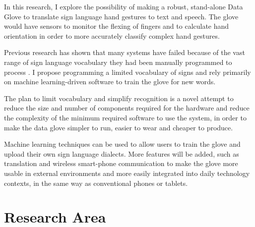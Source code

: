 

In this research, I explore the possibility of making a robust, stand-alone Data Glove to translate sign language hand gestures to text and speech. The glove would have sensors to monitor the flexing of fingers and to calculate hand orientation in order to more accurately classify complex hand gestures. 

Previous research has shown that many systems have failed because of the vast range of sign language vocabulary they had been manually programmed to process \parencite{DipietroL.SabatiniA.M.Dario2008}. I propose programming a limited vocabulary of signs and rely primarily on machine learning-driven software to train the glove for new words.

The plan to limit vocabulary and simplify recognition is a novel attempt to reduce the size and number of components required for the hardware and reduce the complexity of the minimum required software to use the system, in order to make the data glove simpler to run, easier to wear and cheaper to produce.

Machine learning techniques can be used to allow users to train the glove and upload their own sign language dialects. More features will be added, such as translation and wireless smart-phone communication to make the glove more usable in external environments and more easily integrated into daily technology contexts, in the same way as conventional phones or tablets.

\section{Research Area}

